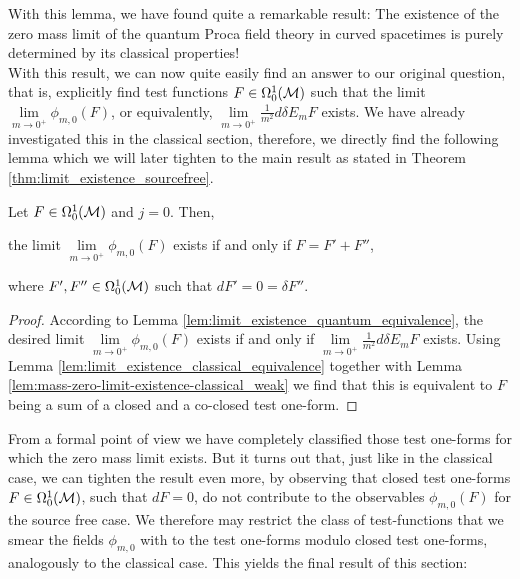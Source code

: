 With this lemma, we have found quite a remarkable result: The existence of the zero mass limit of the quantum Proca field theory in curved spacetimes is purely determined by its classical properties!\\
With this result, we can now quite easily find an answer to our original question, that is, explicitly find test functions $F \in \Omega^1_0(\mathcal{M})$ such that the limit $\lim\limits_{m \to 0^+} \phi_{m,0}(F)$, or equivalently, $\lim\limits_{m \to 0^+} \frac{1}{m^2}d \delta E_m F $ exists. We have already investigated this in the classical section, therefore, we directly find the following lemma which we will later tighten to the main result as stated in Theorem \ref{thm:limit_existence_sourcefree}.
\begin{lemma}\label{lem:mass-zero-limit-existence_weak}
Let $F\in \Omega^1_0(\mathcal{M})$ and $j=0$. Then,
\begin{center}
the limit $\lim\limits_{m \to 0^+}  \phi_{m,0}(F)$ exists if and only if $F = F' + F''$,\\
\end{center}
where $F', F'' \in \Omega^1_0(\mathcal{M})$ such that $dF' = 0 = \delta F''$.
\end{lemma}
\begin{proof}
	According to Lemma \ref{lem:limit_existence_quantum_equivalence}, the desired limit $\lim\limits_{m \to 0^+}  \phi_{m,0}(F)$ exists if and only if $\lim\limits_{m \to 0^+} \frac{1}{m^2}d \delta E_m F $ exists. Using Lemma \ref{lem:limit_existence_classical_equivalence} together with Lemma \ref{lem:mass-zero-limit-existence-classical_weak} we find that this is equivalent to $F$ being a sum of a closed and a co-closed test one-form.
\end{proof}
From a formal point of view we have completely classified those test one-forms for which the zero mass limit exists. But it turns out that, just like in the classical case, we can tighten the result even more, by observing that closed test one-forms $F \in \Omega^1_0(\mathcal{M})$, such that $dF=0$, do not contribute to the observables $\phi_{m,0}(F)$ for the source free case. We therefore may restrict the class of test-functions that we smear the fields $\phi_{m,0}$ with to the test one-forms modulo closed test one-forms, analogously to the classical case. This yields the final result of this section:
%
%
